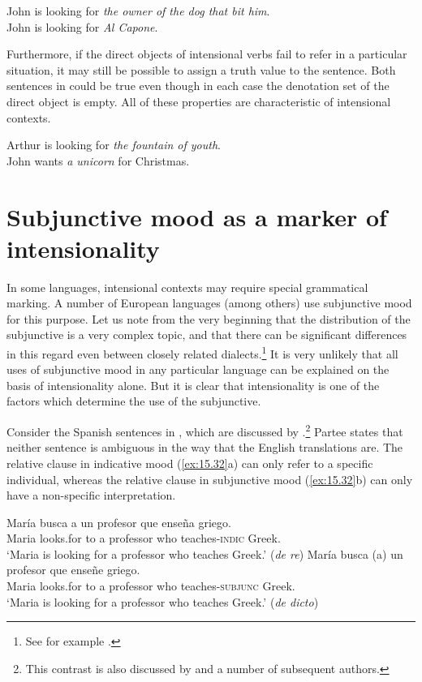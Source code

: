 \ea \label{ex:15.30}
\ea  John is looking for \textit{the owner of the dog that bit him}.\\
\ex John is looking for \textit{Al Capone}.
                       \z
\z


Furthermore, if the direct objects of intensional verbs fail to refer in a particular situation, it may still be possible to assign a truth value to the sentence. Both sentences in  could be true even though in each case the denotation set of the direct object is empty. All of these properties are characteristic of intensional contexts.


\ea \label{ex:15.31}
\ea  Arthur is looking for \textit{the fountain of youth}.\\
\ex John wants \textit{a unicorn} for Christmas.
                       \z
\z

\section{Subjunctive mood as a marker of intensionality}\label{sec:15.5}

In some languages, intensional contexts may require special grammatical marking. A number of European languages (among others) use subjunctive mood for this purpose. Let us note from the very beginning that the distribution of the subjunctive is a very complex topic, and that there can be significant differences in this regard even between closely related dialects.\footnote{See for example \citet{Marques2004}.} It is very unlikely that all uses of subjunctive mood in any particular language can be explained on the basis of intensionality alone. But it is clear that intensionality is one of the factors which determine the use of the subjunctive.



Consider the Spanish sentences in , which are discussed by \citet{Partee2008}.\footnote{This contrast is also discussed by \citet{Quine1956} and a number of subsequent authors.} Partee states that neither sentence is ambiguous in the way that the English translations are. The relative clause in indicative mood (\ref{ex:15.32}a) can only refer to a specific individual, whereas the relative clause in subjunctive mood (\ref{ex:15.32}b) can only have a non-specific interpretation.

\ea \label{ex:15.32}
\ea  \gll María  busca  a  un  profesor  que  enseña  griego.\\
Maria  looks.for  to  a  professor  who  teaches-\textsc{indic}  Greek.\\
\glt ‘Maria is looking for a professor who teaches Greek.’  (\textit{de re})
\ex \gll María  busca  (a)  un  profesor  que  enseñe  griego.\\
Maria  looks.for  to  a  professor  who  teaches-\textsc{subjunc}  Greek.\\
\glt ‘Maria is looking for a professor who teaches Greek.’  (\textit{de dicto})
\z \z


